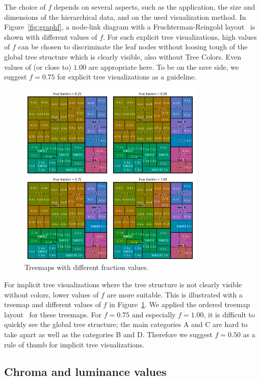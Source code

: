 \documentclass[journal]{vgtc}                %
\begin{document}
The choice of $f$ depends on several aspects, such as the application, the size and dimensions of the hierarchical data, and on the used visualization method. In Figure~\ref{fig:graphf}, a node-link diagram with a Fruchterman-Reingold layout~\cite{Fruchterman91} is shown with different values of ${f}$. For such explicit tree visualizations, high values of ${f}$ can be chosen to discriminate the leaf nodes without loosing tough of the global tree structure which is clearly visible, also without Tree Colors. Even values of (or close to) $1.00$ are appropriate here. To be on the save side, we suggest $f=0.75$ for explicit tree visualizations as a guideline.

\begin{figure}[!t]
  \centering
  \includegraphics[width=3.5in]{Treemaps_hue.pdf}
  \caption{Treemaps with different fraction values.}\label{fig:treemapf}
\end{figure}


For implicit tree visualizations where the tree structure is not clearly visible without colors, lower values of $f$ are more suitable. This is illustrated with a treemap and different values of $f$ in Figure~\ref{fig:treemapf}. We applied the ordered treemap layout~\cite{Bederson2002} for these treemaps. For $f=0.75$ and especially $f=1.00$, it is difficult to quickly see the global tree structure; the main categories A and C are hard to take apart as well as the categories B and D. Therefore we suggest $f=0.50$ as a rule of thumb for implicit tree visualizations.

\subsection{Chroma and luminance values}
\end{document}
